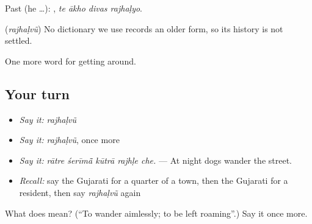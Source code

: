Past (he …):    , \emph{te ākho divas rajhaḷyo}.

\begin{cousinweb}
\textbf{} (\emph{rajhaḷvũ}) No dictionary we use records an older form, so its history is not settled.
\end{cousinweb}

\begin{grammarlens}[title={What you've built}]
One more word for getting around.
\end{grammarlens}

\subsection*{Your turn}
\begin{itemize}
\raggedright
  \item \emph{Say it:} \emph{rajhaḷvũ}
  \item \emph{Say it:} \emph{rajhaḷvũ}, once more
  \item \emph{Say it:} \emph{rātre śerīmā̃ kūtrā rajhḷe che.} — At night dogs wander the street.
  \item \emph{Recall:} say the Gujarati for a quarter of a town, then the Gujarati for a resident, then say \emph{rajhaḷvũ} again
\end{itemize}

\begin{tcolorbox}[breakable,colback=teal!4,colframe=teal!35!black,title={Before you move on}]
What does  mean? (\textquotedblleft{}To wander aimlessly; to be left roaming\textquotedblright{}.) Say it once more.
\end{tcolorbox}
